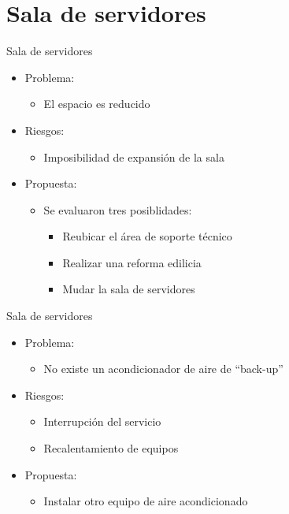 \documentclass[spanish]{beamer}
\begin{document}
\section[Outline]{Sala de servidores}

\begin{frame}{Sala de servidores}
  \begin{itemize}
  \item Problema:
    \begin{itemize}
    \item El espacio es reducido
    \end{itemize}
    \item Riesgos:
      \begin{itemize}
      \item Imposibilidad de expansión de la sala
      \end{itemize}
  \item Propuesta:
    \begin{itemize}
    \item Se evaluaron tres posiblidades:
      \begin{itemize}
      \item Reubicar el área de soporte técnico
      \item Realizar una reforma edilicia
      \item Mudar la sala de servidores
      \end{itemize}
    \end{itemize}
  \end{itemize}
\end{frame}


\begin{frame}{Sala de servidores}
  \begin{itemize}
  \item Problema:
    \begin{itemize}
    \item No existe un acondicionador de aire de ``back-up''
    \end{itemize}
    \item Riesgos:
      \begin{itemize}
      \item Interrupción del servicio
      \item Recalentamiento de equipos
      \end{itemize}
  \item Propuesta:
    \begin{itemize}
    \item Instalar otro equipo de aire acondicionado
    \end{itemize}
  \end{itemize}
\end{frame}
\end{document}
